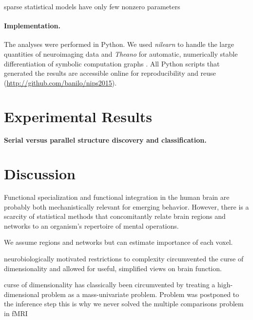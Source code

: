 \documentclass{article} %
\begin{document}
{sparse statistical models have only few nonzero parameters












\paragraph{Implementation.}
The analyses were performed in Python.
We used \textit{nilearn} to handle
the large quantities of neuroimaging data 
\cite{abrah14}
and
\textit{Theano} for automatic, numerically stable
differentiation of symbolic computation graphs
\cite{bastien2012theano, bergstra2010theano}.
All Python scripts that generated the results are
accessible online for reproducibility and reuse
(\url{http://github.com/banilo/nips2015}).



\section{Experimental Results}
\paragraph{Serial versus parallel structure discovery and classification.}



\section{Discussion}

Functional specialization and functional integration
in the human brain are
probably both mechanistically relevant for emerging behavior.
However, there is a scarcity of statistical methods
that concomitantly relate brain regions and networks to
an organism's repertoire of mental operations.


We assume regions and networks but can estimate 
importance of each voxel.

neurobiologically motivated restrictions to
complexity circumvented the curse of dimensionality and allowed
for useful, simplified views on brain function.





curse of dimensionality has classically been circumvented
by treating a high-dimensional problem
as a mass-univariate problem.
Problem was postponed to the inference step
this is why we never solved the multiple comparisons problem in fMRI

}
\end{document}
